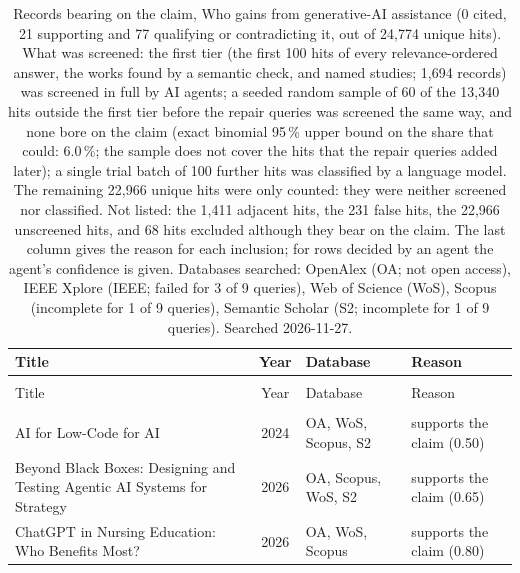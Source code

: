\ifdefined\XeTeXversion\providecommand{\scholarnonlatin}[1]{#1}\fi
\ifdefined\directlua\providecommand{\scholarnonlatin}[1]{#1}\fi
\providecommand{\scholarnonlatin}[1]{[non-Latin text]}
\begingroup\footnotesize
\begin{longtable}{@{}%
  >{\raggedright\arraybackslash}p{}c%
  >{\raggedright\arraybackslash}p{}%
  >{\raggedright\arraybackslash}p{}@{}}
\caption{Records bearing on the claim, Who gains from generative-AI assistance (0 cited, 21 supporting and 77 qualifying or contradicting it, out of 24,774 unique hits). What was screened: the first tier (the first 100 hits of every relevance-ordered answer, the works found by a semantic check, and named studies; 1,694 records) was screened in full by AI agents; a seeded random sample of 60 of the 13,340 hits outside the first tier before the repair queries was screened the same way, and none bore on the claim (exact binomial 95\,\% upper bound on the share that could: 6.0\,\%; the sample does not cover the hits that the repair queries added later); a single trial batch of 100 further hits was classified by a language model. The remaining 22,966 unique hits were only counted: they were neither screened nor classified. Not listed: the 1,411 adjacent hits, the 231 false hits, the 22,966 unscreened hits, and 68 hits excluded although they bear on the claim. The last column gives the reason for each inclusion; for rows decided by an agent the agent's confidence is given. Databases searched: OpenAlex (OA; not open access), IEEE Xplore (IEEE; failed for 3 of 9 queries), Web of Science (WoS), Scopus (incomplete for 1 of 9 queries), Semantic Scholar (S2; incomplete for 1 of 9 queries). Searched 2026-11-27.}\label{tab:who-gains:hits-table}\\
\toprule
Title & Year & Database & Reason \\
\midrule
\endfirsthead
\multicolumn{4}{@{}l}{\emph{\tablename~\thetable{} (cont.)}}\\
\toprule
Title & Year & Database & Reason \\
\midrule
\endhead
\midrule \multicolumn{4}{r@{}}{\emph{continued on next page}}\\
\endfoot
\bottomrule
\endlastfoot
AI for Low-Code for AI & 2024 & OA, WoS, Scopus, S2 & supports the claim (0.50) \\
Beyond Black Boxes: Designing and Testing Agentic AI Systems for Strategy & 2026 & OA, Scopus, WoS, S2 & supports the claim (0.65) \\
ChatGPT in Nursing Education: Who Benefits Most? & 2026 & OA, WoS, Scopus & supports the claim (0.80) \\

\end{longtable}
